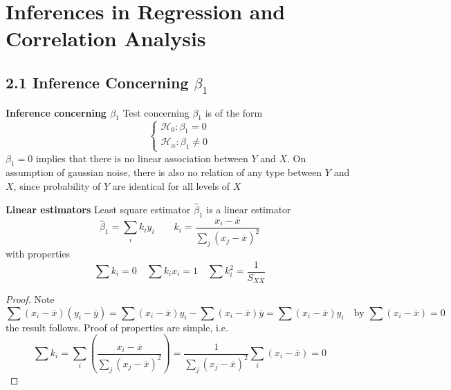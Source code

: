 \documentclass[11pt]{article}
\begin{document}
\section*{Inferences in Regression and Correlation Analysis}


\subsection*{2.1 Inference Concerning $\beta_1$}


\begin{defn*}
    \textbf{Inference concerning $\beta_1$} Test concerning $\beta_1$ is of the form 
    \[
        \begin{cases*}
            \mathcal{H}_0: \beta_1 = 0\\
            \mathcal{H}_{\alpha}: \beta_1 \neq 0  
        \end{cases*}
    \]
    $\beta_1 = 0$ implies that there is no linear association between $Y$ and $X$. On assumption of gaussian noise, there is also no relation of any type between $Y$ and $X$, since probability of $Y$ are identical for all levels of $X$ 
\end{defn*} 


\begin{defn*}
    \textbf{Linear estimators} Least square estimator $\hat{\beta}_1$ is a linear estimator
    \[
        \hat{\beta}_1 = \sum_i k_i y_i \quad \quad k_i = \frac{x_i -\overline{x}}{\sum_j (x_j - \overline{x})^2}
    \]
    with properties
    \[
        \sum k_i = 0 \quad \sum k_i x_i = 1 \quad \sum k_i^2 = \frac{1}{S_{XX}}
    \]
    \begin{proof}
        Note
        \[
            \sum (x_i - \overline{x})(y_i - \overline{y}) = \sum (x_i - \overline{x})y_i - \sum (x_i - \overline{x})\overline{y} = \sum (x_i - \overline{x})y_i \quad \text{by $\sum (x_i - \overline{x}) = 0$}
        \]
        the result follows. Proof of properties are simple, i.e.
        \[
            \sum k_i = \sum_i \left( \frac{x_i - \overline{x}}{\sum_j (x_j - \overline{x})^2} \right) = \frac{1}{\sum_j (x_j - \overline{x})^2} \sum_i (x_i - \overline{x}) = 0
        \]
    \end{proof}
\end{defn*}
\end{document}
